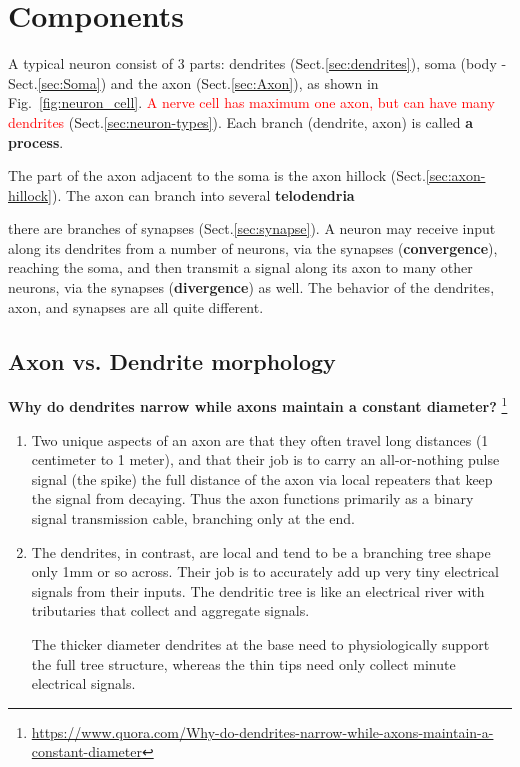 \section{Components}

A typical neuron consist of 3 parts: dendrites (Sect.\ref{sec:dendrites}), soma
(body - Sect.\ref{sec:Soma}) and the axon (Sect.\ref{sec:Axon}), as shown in
Fig.~\ref{fig:neuron_cell}. \textcolor{red}{A nerve cell has maximum one axon,
but can have many dendrites} (Sect.\ref{sec:neuron-types}). Each branch
(dendrite, axon) is called {\bf a process}.

The part of the axon adjacent to the soma is the axon hillock
(Sect.\ref{sec:axon-hillock}). The axon can branch into several {\bf
telodendria}


there are branches of synapses (Sect.\ref{sec:synapse}). A neuron
may receive input along its dendrites from a number of neurons, via the synapses ({\bf convergence}),
reaching the soma, and then transmit a signal along its axon to many other
neurons, via the synapses ({\bf divergence}) as well. The behavior of the
dendrites, axon, and synapses are all quite different.

\subsection{Axon vs. Dendrite morphology}

{\bf Why do dendrites narrow while axons maintain a constant diameter?}
\footnote{\url{https://www.quora.com/Why-do-dendrites-narrow-while-axons-maintain-a-constant-diameter}}
\begin{enumerate}
  
  \item  Two unique aspects of an axon are that they often travel long distances
  (1 centimeter to 1 meter), and that their job is to carry an all-or-nothing
  pulse signal (the spike) the full distance of the axon via local repeaters
  that keep the signal from decaying. Thus the axon functions primarily as a
  binary signal transmission cable, branching only at the end.
  
  \item The dendrites, in contrast, are local and tend to be a branching tree
  shape only 1mm or so across. Their job is to accurately add up very tiny electrical signals from their inputs.
   The dendritic tree is like an electrical river with tributaries that collect
   and aggregate signals.
  
  The thicker diameter dendrites at the base need to physiologically support the
  full tree structure, whereas the thin tips need only collect minute electrical signals.
  
  
\end{enumerate}

